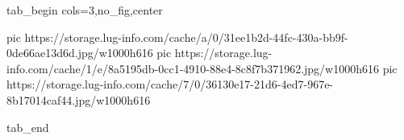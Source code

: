  
 
 
 
 


\ifcmt
  tab_begin cols=3,no_fig,center

     pic https://storage.lug-info.com/cache/a/0/31ee1b2d-44fc-430a-bb9f-0de66ae13d6d.jpg/w1000h616%
		 pic https://storage.lug-info.com/cache/1/e/8a5195db-0cc1-4910-88e4-8c8f7b371962.jpg/w1000h616%
		 pic https://storage.lug-info.com/cache/7/0/36130e17-21d6-4ed7-967e-8b17014caf44.jpg/w1000h616%

  tab_end
\fi
